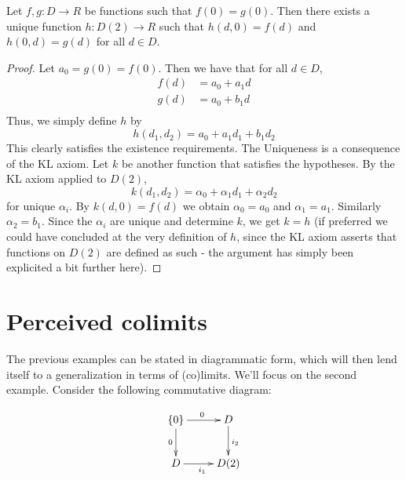 \begin{proposition}
  Let \( f,g:D\to R \) be functions such that \( f(0)=g(0) \). Then there exists a unique function \( h:D(2)\to R \) such that \( h(d,0) = f(d) \) and \( h(0,d)=g(d) \) for all \( d\in D \).
  \label{prop:d2}
\end{proposition}

\begin{proof}
  Let \( a_0 = g(0)=f(0) \). Then we have that for all \( d\in D \),
  \begin{align*}
    f(d) &= a_0 + a_1d \\
    g(d) &= a_0 + b_1d \\
  \end{align*}
  Thus, we simply define \( h \) by
  \begin{equation*}
    h(d_1,d_2) = a_0 + a_1d_1 + b_1d_2
  \end{equation*}
  This clearly satisfies the existence requirements. The Uniqueness is a consequence of the KL axiom. Let \( k \) be another function that satisfies the hypotheses. By the KL axiom applied to \( D(2) \),
  \begin{equation*}
    k(d_1,d_2) = \alpha_0 + \alpha_1d_1 + \alpha_2d_2
  \end{equation*}
  for unique \( \alpha_i \). By \( k(d,0)=f(d) \) we obtain \( \alpha_0=a_0 \) and \( \alpha_1 = a_1 \). Similarly \( \alpha_2=b_1 \). Since the \( \alpha_i \) are unique and determine \( k \), we get \( k=h \) (if preferred we could have concluded at the very definition of \( h \), since the KL axiom asserts that functions on \( D(2) \) are defined as such - the argument has simply been explicited a bit further here).

\end{proof}

\section{Perceived colimits}

The previous examples can be stated in diagrammatic form, which will then lend itself to a generalization in terms of (co)limits. We'll focus on the second example. Consider the following commutative diagram:

\begin{equation}
  \xymatrix{
    {\{0\}} \ar[d]_0 \ar[r]^0   & D \ar[d]^{i_2} \\
    D \ar[r]_{i_1}              & D(2)
  }
  \label{dg:pushout}
\end{equation}

